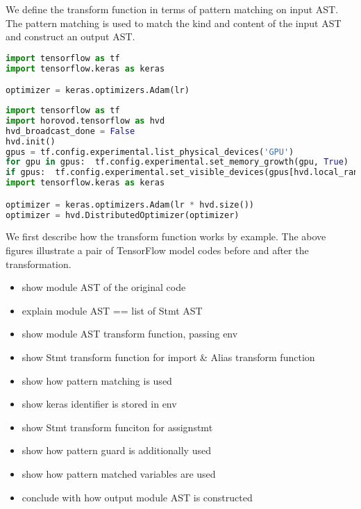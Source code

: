We define the transform function in terms of pattern matching on input AST.
The pattern matching is used to match the kind and content of the input AST
and construct an output AST.


\begin{lstlisting}[language=Python, caption = Original code example]
import tensorflow as tf
import tensorflow.keras as keras

optimizer = keras.optimizers.Adam(lr)
\end{lstlisting}

\begin{lstlisting}[language=Python, caption = Transformed code example]
import tensorflow as tf
import horovod.tensorflow as hvd
hvd_broadcast_done = False
hvd.init()
gpus = tf.config.experimental.list_physical_devices('GPU')
for gpu in gpus:  tf.config.experimental.set_memory_growth(gpu, True)
if gpus:  tf.config.experimental.set_visible_devices(gpus[hvd.local_rank()], 'GPU')
import tensorflow.keras as keras

optimizer = keras.optimizers.Adam(lr * hvd.size())
optimizer = hvd.DistributedOptimizer(optimizer)
\end{lstlisting}

We first describe how the transform function works by example.
The above figures illustrate a pair of TensorFlow model codes
before and after the transformation.


\begin{itemize}
  \item show module AST of the original code
  \item explain module AST == list of Stmt AST
  \item show module AST transform function, passing env
  \item show Stmt transform function for import \& Alias transform function
  \item show how pattern matching is used
  \item show keras identifier is stored in env
  \item show Stmt transform funciton for assignstmt
  \item show how pattern guard is additionally used
  \item show how pattern matched variables are used
  \item conclude with how output module AST is constructed
\end{itemize}

